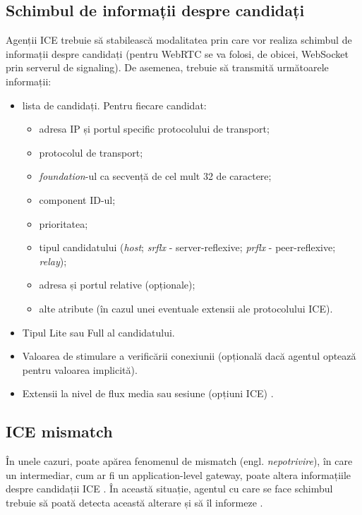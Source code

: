 \subsection{Schimbul de informații despre candidați}
\indent \par Agenții ICE trebuie să stabilească modalitatea prin care vor realiza schimbul de informații despre candidați (pentru WebRTC se va folosi, de obicei, WebSocket prin serverul de signaling). De asemenea, trebuie să transmită următoarele informații:
\begin{itemize}
    \item lista de candidați. Pentru fiecare candidat:
    \begin{itemize}
        \item adresa IP și portul specific protocolului de transport;
        \item protocolul de transport;
        \item \textit{foundation}-ul ca secvență de cel mult 32 de caractere;
        \item component ID-ul;
        \item prioritatea;
        \item tipul candidatului (\textit{host}; \textit{srflx} - server-reflexive; \textit{prflx} - peer-reflexive; \textit{relay});
        \item adresa și portul relative (opționale);
        \item alte atribute (în cazul unei eventuale extensii ale protocolului ICE).
    \end{itemize}
    \item Tipul Lite sau Full al candidatului.
    \item Valoarea de stimulare a verificării conexiunii (opțională dacă agentul optează pentru valoarea implicită).
    \item Extensii la nivel de flux media sau sesiune (opțiuni ICE) \cite{rfc8445}.
\end{itemize}
\subsection{ICE mismatch}
\indent \par În unele cazuri, poate apărea fenomenul de mismatch (engl. \textit{nepotrivire}), în care un intermediar, cum ar fi un application-level gateway, poate altera informațiile despre candidații ICE \cite{rfc8445}. În această situație, agentul cu care se face schimbul trebuie să poată detecta această alterare și să îl informeze \cite{rfc8445}.

